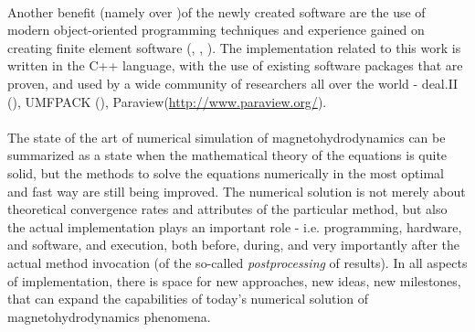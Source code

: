 \paragraph{}
Another benefit (namely over \citep{zeus})of the newly created software are the use of modern object-oriented programming techniques and experience gained on creating finite element software (\citep{ja1}, \citep{ja2}, \citep{ja3}).
The implementation related to this work is written in the C++ language, with the use of existing software packages that are proven, and used by a wide community of researchers all over the world - deal.II (\citep{deal}), UMFPACK (\citep{umfpack}), Paraview(\url{http://www.paraview.org/}).

\paragraph{}
The state of the art of numerical simulation of magnetohydrodynamics can be summarized as a state when the mathematical theory of the equations is quite solid, but the methods to solve the equations numerically in the most optimal and fast way are still being improved. The numerical solution is not merely about theoretical convergence rates and attributes of the particular method, but also the actual implementation plays an important role - i.e. programming, hardware, and software, and execution, both before, during, and very importantly after the actual method invocation (of the so-called \textit{postprocessing} of results). In all aspects of implementation, there is space for new approaches, new ideas, new milestones, that can expand the capabilities of today's numerical solution of magnetohydrodynamics phenomena.
